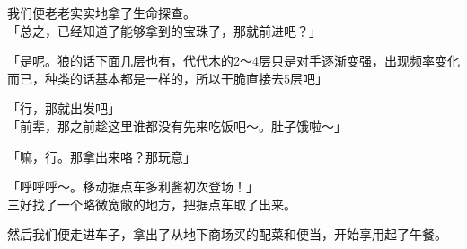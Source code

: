 我们便老老实实地拿了生命探查。\\

「总之，已经知道了能够拿到的宝珠了，那就前进吧？」

「是呢。狼的话下面几层也有，代代木的2～4层只是对手逐渐变强，出现频率变化而已，种类的话基本都是一样的，所以干脆直接去5层吧」

「行，那就出发吧」\\

「前辈，那之前趁这里谁都没有先来吃饭吧～。肚子饿啦～」

「嘛，行。那拿出来咯？那玩意」

「呼呼呼～。移动据点车多利酱初次登场！」\\

三好找了一个略微宽敞的地方，把据点车取了出来。

然后我们便走进车子，拿出了从地下商场买的配菜和便当，开始享用起了午餐。\\
